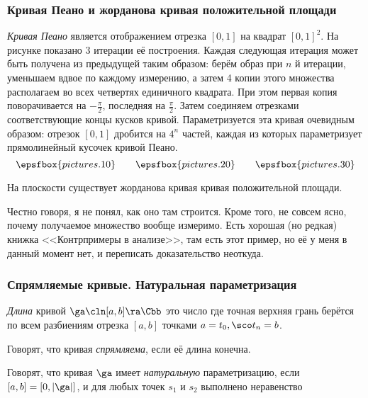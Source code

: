 \documentclass[a4paper]{article}
\begin{document}
\subsubsection{Кривая Пеано и жорданова кривая положительной площади}

\emph{Кривая Пеано} является отображением отрезка $[0,1]$ на квадрат $[0,1]^2$. На рисунке показано 3 итерации её
построения. Каждая следующая итерация может быть получена из предыдущей таким образом: берём образ при $n$ й
итерации, уменьшаем вдвое по каждому измерению, а затем 4 копии этого множества располагаем во всех четвертях
единичного квадрата. При этом первая копия поворачивается на $-\frac{\pi}{2}$, последняя на $\frac{\pi}{2}$.
Затем соединяем отрезками соответствующие концы кусков кривой. Параметризуется эта кривая очевидным образом: отрезок
$[0,1]$ дробится на $4^n$ частей, каждая из которых параметризует прямолинейный кусочек кривой Пеано.
$$\epsfbox{pictures.10}\quad\quad\epsfbox{pictures.20}\quad\quad\epsfbox{pictures.30}$$

\begin{stm}
На плоскости существует жорданова кривая кривая положительной площади.
\end{stm}

\begin{petit}
Честно говоря, я не понял, как оно там строится. Кроме того, не совсем ясно, почему получаемое
множество вообще измеримо. Есть хорошая (но редкая) книжка <<Контрпримеры в анализе>>,
там есть этот пример, но её у меня в данный момент нет, и переписать доказательство неоткуда.
\end{petit}

\subsubsection{Спрямляемые кривые. Натуральная параметризация}

\begin{df}
\emph{Длина} кривой $\ga\cln [a,b]\ra\Cbb$ это число
где точная верхняя грань берётся по всем разбиениям отрезка $[a,b]$ точками $a=t_0,\sco t_n=b$.
\end{df}

\begin{df}
Говорят, что кривая \emph{спрямляема}, если её длина конечна.
\end{df}

\begin{df}
Говорят, что кривая $\ga$ имеет \emph{натуральную} параметризацию, если $[a,b] = [0,|\ga|]$, и для любых точек
$s_1$ и  $s_2$ выполнено неравенство
\end{df}
\end{document}
